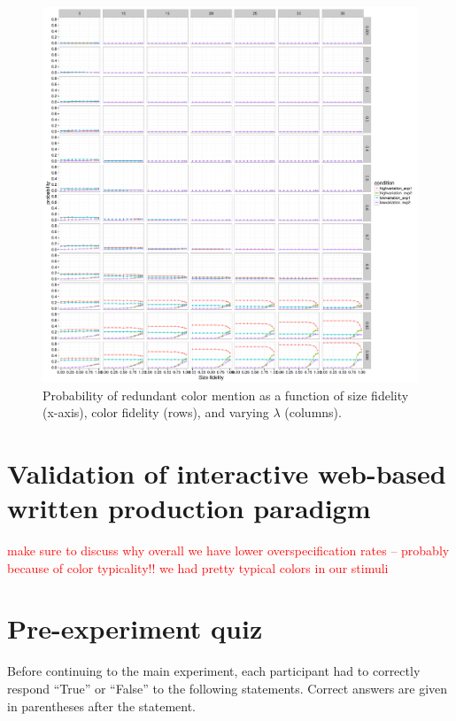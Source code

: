 \documentclass[11pt]{article}
\newcommand{\red}[1]{\textcolor{Red}{#1}}
\begin{document}
\begin{figure}
\includegraphics[width=\textwidth]{pics/koolen-full-exploration}
\caption{Probability of redundant color mention as a function of size fidelity (x-axis), color fidelity (rows), and varying $\lambda$ (columns).}
\label{fig:koolenfullfullexploration}
\end{figure}


\section{Validation of interactive web-based written production paradigm}
\label{app:replication}

\red{make sure to discuss why overall we have lower overspecification rates -- probably because of color typicality!! we had pretty typical colors in our stimuli}

\section{Pre-experiment quiz}
\label{app:numdistractors}

Before continuing to the main experiment, each participant had to correctly respond ``True'' or ``False'' to the following statements. Correct answers are given in parentheses after the statement.
\end{document}
